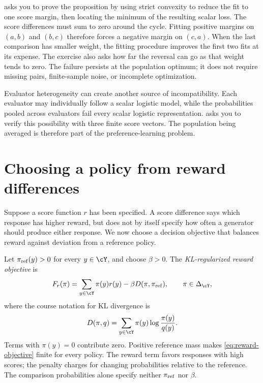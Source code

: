 \documentclass[11pt,twoside]{article}
\newcommand{\KL}{D}
\theoremstyle{definition}
\theoremstyle{remark}
\begin{document}
 asks you to prove the proposition by using
strict convexity to reduce the fit to one score margin, then locating the
minimum of the resulting scalar loss. The score differences must sum to
zero around the cycle. Fitting positive margins on $(a,b)$ and $(b,c)$
therefore forces a negative margin on $(c,a)$. When the last comparison
has smaller weight, the fitting procedure improves the first two fits at
its expense. The exercise also asks how far the reversal can go as that
weight tends to zero.
The failure persists at the population optimum; it does not require
missing pairs, finite-sample noise, or incomplete optimization.

Evaluator heterogeneity can create another source of incompatibility.
Each evaluator may individually follow a scalar logistic model, while
the probabilities pooled across evaluators fail every scalar logistic
representation.  asks you to verify this
possibility with three finite score vectors. The population being averaged
is therefore part of the preference-learning problem.

\section{Choosing a policy from reward differences}
\label{sec:gibbs}

Suppose a score function $r$ has been specified. A score difference says
which response has higher reward, but does not by itself specify how
often a generator should produce either response. We now choose a decision
objective that balances reward against deviation from a reference policy.

Let $\pi_{\rm ref}(y)>0$ for every $y\in\cY$, and choose $\beta>0$.
The \emph{KL-regularized reward objective} is
\begin{equation}
 F_r(\pi)=\sum_{y\in\cY}\pi(y)r(y)-\beta\KL(\pi,\pi_{\rm ref}),
 \qquad \pi\in\Delta_{\cY},
 \label{eq:reward-objective}
\end{equation}
where the course notation for KL divergence is
\[
 \KL(\pi,q)=\sum_{y\in\cY}\pi(y)\log\frac{\pi(y)}{q(y)}.
\]
Terms with $\pi(y)=0$ contribute zero. Positive reference mass makes
\cref{eq:reward-objective} finite for every policy. The reward term favors
responses with high scores; the penalty charges for changing probabilities
relative to the reference. The comparison probabilities alone specify
neither $\pi_{\rm ref}$ nor $\beta$.
\label{en:reference-support}
\end{document}
